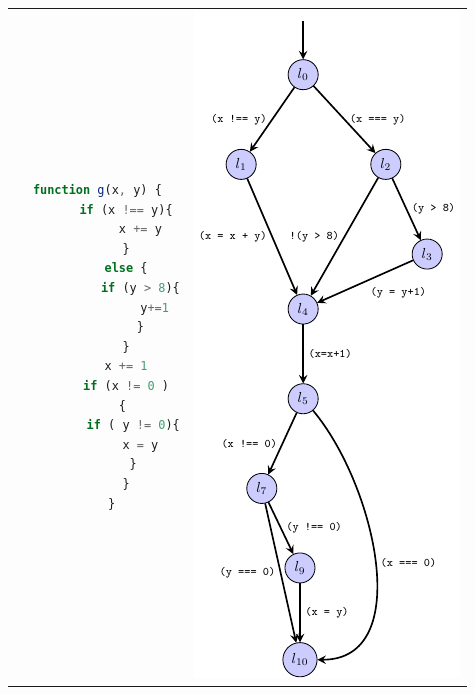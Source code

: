 \begin{tabular*}{\textwidth}{@{}c|c@{}}
    
\begin{minipage}{\dimexpr0.5\textwidth-2\tabcolsep}
\centering

\begin{lstlisting}[language=JavaScript, gobble=4, escapechar=@]
    function g(x, y) {
        if (x !== y){
            x += y
        }
        else {
            if (y > 8){
                y+=1
            }
        }
        x += 1
        if (x != 0 )
        { 
          if ( y != 0){
            x = y
          }
        }
    }
\end{lstlisting}
   
\end{minipage}
&
\begin{minipage}{\dimexpr0.5\textwidth-2\tabcolsep}
\centering
     \includegraphics{../luatex/cfg/out/cfg.pdf}
\end{minipage}


\end{tabular*}
